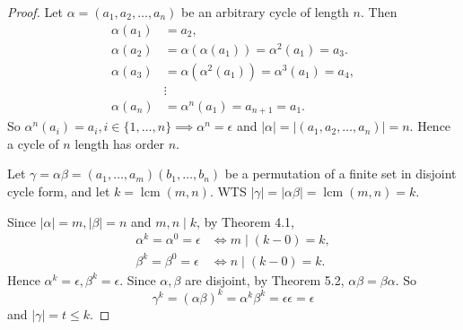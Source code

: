 \documentclass{article}
\DeclareMathOperator{\lcm}{lcm}
\theoremstyle{definition}
\begin{document}
 \begin{proof}
     Let $\alpha = (a_1,a_2,\dots,a_n)$ be an arbitrary cycle of length $n$. Then
     \begin{align*}
         \alpha(a_1) &= a_2, \\
         \alpha(a_2) &= \alpha(\alpha(a_1)) = \alpha^2(a_1) = a_3. \\
         \alpha(a_3) &= \alpha(\alpha^2(a_1)) = \alpha^3(a_1) = a_4, \\
         & \vdots \\
         \alpha(a_n) &= \alpha^n(a_1) = a_{n+1} = a_1.
     \end{align*}
     So $\alpha^n(a_i) = a_i, i \in \{1,\dots,n\} \implies \alpha^n = \epsilon$ and $|\alpha| = |(a_1,a_2,\dots,a_n)| = n$. Hence a cycle of $n$ length has order $n$.
     
     Let $\gamma = \alpha\beta = (a_1,\dots,a_m)(b_1,\dots,b_n)$ be a permutation of a finite set in disjoint cycle form, and let $k=\lcm(m,n)$. WTS $|\gamma| = |\alpha\beta| = \lcm(m,n)=k$. 
     
     Since $|\alpha|=m,|\beta|=n$ and $m,n \mid k$, by Theorem 4.1,
     \begin{align*}
         \alpha^k = \alpha^0 = \epsilon &\iff m \mid (k-0) = k, \\
         \beta^k = \beta^0 = \epsilon &\iff n \mid (k-0) = k.
     \end{align*}
     Hence $\alpha^k = \epsilon, \beta^k = \epsilon$. Since $\alpha,\beta$ are disjoint, by Theorem 5.2, $\alpha\beta=\beta\alpha$. So
     \begin{equation*}
         \gamma^k = (\alpha\beta)^k = \alpha^k\beta^k = \epsilon\epsilon = \epsilon
     \end{equation*}
     and $|\gamma|=t \leq k$. 
     

\end{proof}
\end{document}
